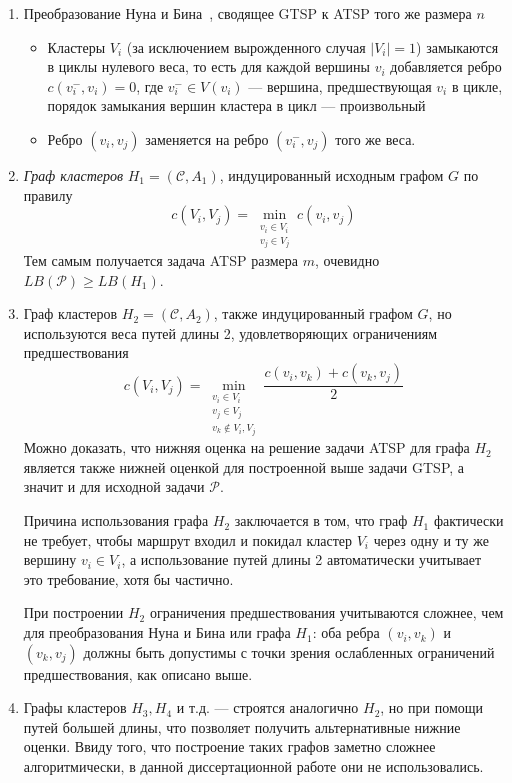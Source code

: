 \begin{enumerate}
  \item Преобразование Нуна и Бина~\cite{NoonBean1993},
    сводящее GTSP к ATSP того же размера $n$
  \begin{itemize}
    \item
    Кластеры $V_i$
    (за исключением вырожденного случая $|V_i|=1$)
    замыкаются в циклы нулевого веса,
    то есть для каждой вершины $v_i$ добавляется ребро
    $c(v_i^-,v_i)=0$,
    где $v_i^- \in V(v_i)$ --- вершина, предшествующая $v_i$ в цикле,
    порядок замыкания вершин кластера в цикл --- произвольный
    \item
    Ребро $(v_i, v_j)$
    заменяется на ребро $(v_i^-,v_j)$
    того же веса.
  \end{itemize}
  \item
  \textit{Граф кластеров}
  $H_1 = (\mathcal C, A_1)$,
  индуцированный исходным графом $G$
  по правилу
  $$
    c(V_i, V_j)=\min_{\substack{v_i\in V_i \\ v_j \in V_j}}
    c(v_i,v_j)
  $$
  Тем самым получается задача ATSP размера $m$,
  очевидно
  $LB(\mathcal P) \geqslant LB(H_1)$.
  \item
  Граф кластеров
  $H_2 = (\mathcal C, A_2)$,
  также индуцированный графом $G$,
  но используются веса путей длины 2,
  удовлетворяющих ограничениям предшествования
  $$
    c(V_i, V_j)=\min_{\substack{v_i\in V_i \\ v_j \in V_j \\ v_k\notin V_i, V_j}}
    \frac{c(v_i,v_k)+c(v_k,v_j)}{2}
  $$
  Можно доказать,
  что нижняя оценка на решение задачи ATSP
  для графа $H_2$
  является также нижней оценкой для
  построенной выше задачи GTSP,
  а значит и для исходной задачи
  $\mathcal P$.

  Причина использования графа $H_2$
  заключается в том, что
  граф $H_1$
  фактически не требует,
  чтобы маршрут входил и покидал кластер $V_i$
  через одну и ту же вершину $v_i \in V_i$,
  а использование путей длины 2
  автоматически учитывает это требование,
  хотя бы частично.

  При построении $H_2$
  ограничения предшествования учитываются сложнее,
  чем для преобразования Нуна и Бина или графа $H_1$:
  оба ребра
  $(v_i, v_k)$ и $(v_k, v_j)$
  должны быть допустимы с точки зрения ослабленных
  ограничений предшествования,
  как описано выше.
  \item
  Графы кластеров $H_3, H_4$ и т.д. ---
  строятся аналогично $H_2$,
  но при помощи путей большей длины,
  что позволяет получить альтернативные нижние оценки.
  Ввиду того,
  что построение таких графов заметно сложнее алгоритмически,
  в данной диссертационной работе они не использовались.
\end{enumerate}

